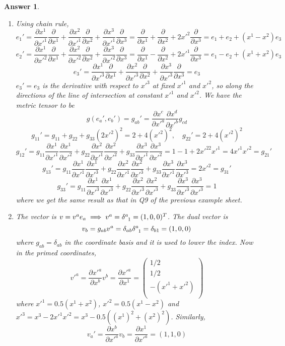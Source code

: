 \documentclass[a4paper]{article}
\theoremstyle{new2}
\newtheorem{ans}{Answer}[section]
\theoremstyle{new}
\begin{document}
\begin{ans}\leavevmode
\begin{enumerate}[label=(\alph*)]
\item Using chain rule,
$$e_1'=\frac{\partial x^1}{\partial x'^1}\frac{\partial}{\partial x^1}+\frac{\partial x^2}{\partial x'^1}\frac{\partial}{\partial x^2}+\frac{\partial x^3}{\partial x'^1}\frac{\partial}{\partial x^3}=\frac{\partial}{\partial x^1}+\frac{\partial}{\partial x^2}+2x'^2\frac{\partial}{\partial x^3}=e_1+e_2+(x^1-x^2)e_3$$
$$e_2'=\frac{\partial x^1}{\partial x'^2}\frac{\partial}{\partial x^1}+\frac{\partial x^2}{\partial x'^2}\frac{\partial}{\partial x^2}+\frac{\partial x^3}{\partial x'^2}\frac{\partial}{\partial x^3}=\frac{\partial}{\partial x^1}-\frac{\partial}{\partial x^2}+2x'^1\frac{\partial}{\partial x^3}=e_1-e_2+(x^1+x^2)e_3$$
$$e_3'=\frac{\partial x^1}{\partial x'^3}\frac{\partial}{\partial x^1}+\frac{\partial x^2}{\partial x'^3}\frac{\partial}{\partial x^2}+\frac{\partial x^3}{\partial x'^3}\frac{\partial}{\partial x^3}=e_3$$
$e_3'=e_3$ is the derivative with respect to $x'^3$ at fixed $x'^1$ and $x'^2$, so along the directions of the line of intersection at constant $x'^1$ and $x'^2$. We have the metric tensor to be 
$$g(e_a',e_b')=g_{ab}'=\frac{\partial x^c}{\partial x'^a}\frac{\partial x^d}{\partial x'^b}g_{cd}$$
$$g_{11}'=g_{11}+g_{22}+g_{33}(2x'^2)^2=2+4(x'^2)^2,\quad g_{22}'=2+4(x'^2)^2$$
$$g_{12}'=g_{11}\frac{\partial x^1}{\partial x'^1}\frac{\partial x^1}{\partial x'^2}+g_{22}\frac{\partial x^2}{\partial x'^1}\frac{\partial x^2}{\partial x'^2}+g_{33}\frac{\partial x^3}{\partial x'^1}\frac{\partial x^3}{\partial x'^2}=1-1+2x'^22x'^1=4x'^1x'^2=g_{21}'$$
$$g_{13}'=g_{11}\frac{\partial x^1}{\partial x'^1}\frac{\partial x^1}{\partial x'^3}+g_{22}\frac{\partial x^2}{\partial x'^1}\frac{\partial x^2}{\partial x'^3}+g_{33}\frac{\partial x^3}{\partial x'^1}\frac{\partial x^3}{\partial x'^3}=2x'^2=g_{31}'$$
$$g_{33}'=g_{11}\frac{\partial x^1}{\partial x'^3}\frac{\partial x^1}{\partial x'^3}+g_{22}\frac{\partial x^2}{\partial x'^3}\frac{\partial x^2}{\partial x'^3}+g_{33}\frac{\partial x^3}{\partial x'^3}\frac{\partial x^3}{\partial x'^3}=1$$
where we get the same result as that in Q9 of the previous example sheet.
\item The vector is $v=v^ae_a\implies v^a=\tensor*{\delta}{*_{}^{a}_{1}}=(1,0,0)^T$. The dual vector is
$$v_b=g_{ab}v^a=\delta_{ab}\tensor*{\delta}{*_{}^{a}_{1}}=\delta_{b1}=(1,0,0)$$
where $g_{ab}=\delta_{ab}$ in the coordinate basis and it is used to lower the index. Now in the primed coordinates,
$$v'^a=\frac{\partial x'^a}{\partial x^b}v^b=\frac{\partial x'^a}{\partial x^1}=\begin{pmatrix}1/2\\1/2\\-(x'^1+x'^2)\\\end{pmatrix}$$
where $x'^1=0.5(x^1+x^2)$, $x'^2=0.5(x^1-x^2)$ and $x'^3=x^3-2x'^1x'^2=x^3-0.5((x^1)^2+(x^2)^2)$. Similarly,
$$v_a'=\frac{\partial x^b}{\partial x'^a}v_b=\frac{\partial x^1}{\partial x'^a}=(1,1,0)$$
\end{enumerate}
\end{ans}
\newpage
\end{document}
